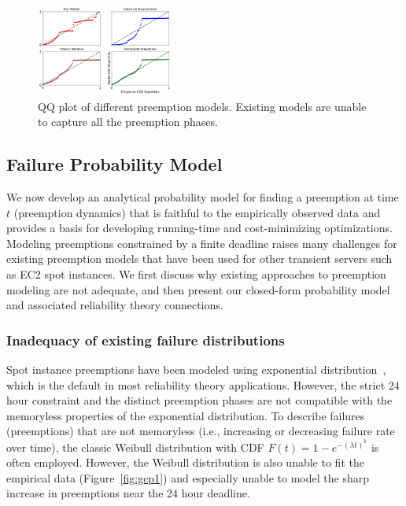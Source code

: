 \begin{figure}
  \includegraphics[width=0.4\textwidth]{../graphs/QQ.pdf}
    \vspace*{-5pt}
  \caption{QQ plot of different preemption models. Existing models are unable to capture all the preemption phases.}
  \label{fig:QQ}
  \vspace*{-5pt}
\end{figure}



\vspace*{\subsecspace}
\subsection{Failure Probability Model}
\label{subsec:analytical-model}

We now develop an analytical probability model for finding a preemption at time $t$ (preemption dynamics) that is faithful to the empirically observed data and provides a basis for developing running-time and cost-minimizing optimizations. %
Modeling preemptions constrained by a finite deadline raises many challenges for existing preemption models that have been used for other transient servers such as EC2 spot instances. 
We first discuss why existing approaches to preemption modeling are not adequate, and then present our closed-form probability model and associated reliability theory connections. 


\subsubsection{Inadequacy of existing failure distributions}

Spot instance preemptions have been modeled using exponential distribution~\cite{bid-cloud, hotcloud-not-bid, flint}, which is the default in most reliability theory applications. 
However, the strict 24 hour constraint and the distinct preemption phases are not compatible with the memoryless properties of the exponential distribution. 
%
To describe failures (preemptions) that are not memoryless (i.e., increasing or decreasing failure rate over time), the classic Weibull distribution with CDF $F(t)=1-e^{-(\lambda t)^k}$ is often employed. However, the Weibull distribution is also unable to fit the empirical data (Figure~\ref{fig:gcp1}) and especially unable to model the sharp increase in preemptions near the 24 hour deadline. 

